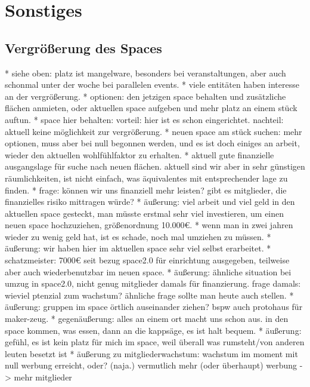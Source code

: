 \documentclass{s0minutes}
\begin{document}
\section{Sonstiges}

\subsection{Vergrößerung des Spaces}

		* siehe oben: platz ist mangelware, besonders bei veranstaltungen, aber auch schonmal unter der woche bei parallelen events.
		* viele entitäten haben interesse an der vergrößerung.
		* optionen: den jetzigen space behalten und zusätzliche flächen anmieten, oder aktuellen space aufgeben und mehr platz an einem stück auftun.
			* space hier behalten: vorteil: hier ist es schon eingerichtet. nachteil: aktuell keine möglichkeit zur vergrößerung.
			* neuen space am stück suchen: mehr optionen, muss aber bei null begonnen werden, und es ist doch einiges an arbeit, wieder den aktuellen wohlfühlfaktor zu erhalten.
		* aktuell gute finanzielle ausgangslage für suche nach neuen flächen. aktuell sind wir aber in sehr günstigen räumlichkeiten, ist nicht einfach, was äquivalentes mit entsprechender lage zu finden.
		* frage: können wir uns finanziell mehr leisten? gibt es mitglieder, die finanzielles risiko mittragen würde?
			* äußerung: viel arbeit und viel geld in den aktuellen space gesteckt, man müsste erstmal sehr viel investieren, um einen neuen space hochzuziehen, größenordnung 10.000€.
				* wenn man in zwei jahren wieder zu wenig geld hat, ist es schade, noch mal umziehen zu müssen.
			* äußerung: wir haben hier im aktuellen space sehr viel selbst erarbeitet.
			* schatzmeister: 7000€ seit bezug space2.0 für einrichtung ausgegeben, teilweise aber auch wiederbenutzbar im neuen space.
			* äußerung: ähnliche situation bei umzug in space2.0, nicht genug mitglieder damals für finanzierung. frage damals: wieviel ptenzial zum wachstum? ähnliche frage sollte man heute auch stellen.
			* äußerung: gruppen im space örtlich auseinander ziehen? bspw auch protohaus für maker-zeug. 
			* gegenäußerung: alles an einem ort macht uns schon aus. in den space kommen, was essen, dann an die kappsäge, es ist halt bequem.
			* äußerung: gefühl, es ist kein platz für mich im space, weil überall was rumsteht/von anderen leuten besetzt ist
			* äußerung zu mitgliederwachstum: wachstum im moment mit null werbung erreicht, oder? (naja.) vermutlich mehr (oder überhaupt) werbung -> mehr mitglieder
\end{document}
